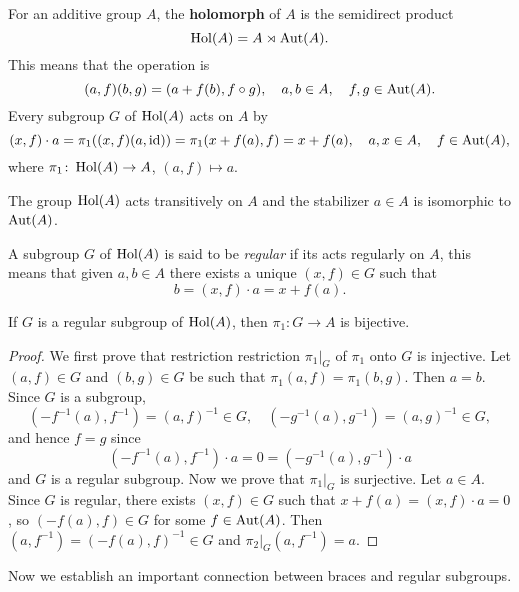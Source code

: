 \chapter{}


For an additive group $A$, the \textbf{holomorph} of $A$ is the semidirect product 
\[
	\operatorname{Hol}(A)=A\rtimes\operatorname{Aut}(A).
\]
This means that the operation is 
\[
	(a,f)(b,g)=(a+f(b),f\circ g),\quad
	a,b\in A,\quad
	f,g\in\operatorname{Aut}(A).
\]
Every subgroup $G$ of $\operatorname{Hol}(A)$ acts on $A$ by 
\[
	(x,f)\cdot a=\pi_1( (x,f)(a,\operatorname{id}) )=\pi_1(x+f(a),f)=x+f(a),\quad
	a,x\in A,\quad 
	f\in\operatorname{Aut}(A),
\]
where $\pi_1\colon \operatorname{Hol}(A)\to A$, $(a,f)\mapsto a$. 

\begin{exercise}
    The group $\operatorname{Hol}(A)$ acts transitively on $A$ 
	and the stabilizer $a\in A$ 
	is isomorphic to $\operatorname{Aut}(A)$. 
\end{exercise}

A subgroup $G$ of $\operatorname{Hol}(A)$ is said to be \emph{regular} 
if its acts regularly on $A$, this means that 
given $a,b\in A$ there exists a unique $(x,f)\in G$ such that
\[
	b=(x,f)\cdot a=x+f(a).
\]

\begin{lemma}
    \label{lem:bijective}
	If $G$ is a regular subgroup of $\operatorname{Hol}(A)$, then $\pi_1\colon G\to A$ is bijective. 
\end{lemma}

\begin{proof}
	We first prove that restriction restriction $\pi_1|_G$ of $\pi_1$ onto $G$ is injective. Let $(a,f)\in G$ and $(b,g)\in G$
	be such that 
	$\pi_1(a,f)=\pi_1(b,g)$. Then $a=b$. Since $G$ is a
	subgroup, 
	\[
		(-f^{-1}(a),f^{-1})=(a,f)^{-1}\in G,
	    \quad
		(-g^{-1}(a),g^{-1})=(a,g)^{-1}\in G,
	\]
	and hence $f=g$ since
	\[
	(-f^{-1}(a),f^{-1})\cdot a=0=(-g^{-1}(a),g^{-1})\cdot a 
	\]
	and $G$ is a regular subgroup.
	Now we prove that $\pi_1|_G$ is surjective. Let $a\in A$. 
	Since $G$ is regular, there exists $(x,f)\in G$ such that $x+f(a)=(x,f)\cdot a=0$, so $(-f(a),f)\in G$ for some $f\in\operatorname{Aut}(A)$. 
	Then $(a,f^{-1})=(-f(a),f)^{-1}\in G$ and $\pi_2|_G(a,f^{-1})=a$. 
\end{proof}

Now we establish an important connection between braces and regular subgroups. 


